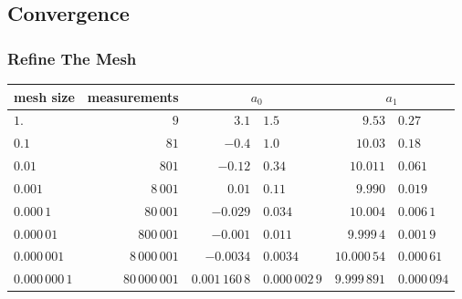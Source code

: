 \subsection{Convergence}
%
%
\begin{frame}\frametitle{Refine The Mesh}
\footnotesize{
\begin{table}[htp]
	\begin{center}
		\begin{tabular}{lr r@{\,$\pm$\,}l r@{\,$\pm$\,}l}
			\multicolumn{1}{c}{mesh size}    & \multicolumn{1}{c}{measurements} & 
			\multicolumn{2}{c}{$a_{0}$} & \multicolumn{2}{c}{$a_{1}$}\\\hline
$1.$ & $9$ & $3.1$ & $1.5$ & $9.53$ & $0.27$ \\
$0.1$ & $81$ & $-0.4$ & $1.0$ & $10.03$ & $0.18$ \\
$0.01$ & $801$ & $-0.12$ & $0.34$ & $10.011$ & $0.061$ \\
$0.001$ & $8\,001$ & $0.01$ & $0.11$ & $9.990$ & $0.019$ \\
$0.000\,1$ & $80\,001$ & $-0.029$ & $0.034$ & $10.004$ & $0.006\,1$ \\
$0.000\,01$ & $800\,001$ & $-0.001$ & $0.011$ & $9.999\,4$ & $0.001\,9$ \\
$0.000\,001$ & $8\,000\,001$ & $-0.0034$ & $0.0034$ & $10.000\,54$ & $0.000\,61$ \\
$0.000\,000\,1$ & $80\,000\,001$ & $0.001\,160\,8$ & $0.000\,002\,9$ & $9.999\,891$ & $0.000\,094$ \\			%
		\end{tabular}
	\end{center}
\label{tab:bevington more convergence numbers}
\end{table}
	}
\end{frame}
%
\newcommand{\xplacem}[0]			{\put(11,54)}
\newcommand{\xplacet}[0]			{\put(5,35)}
\newcommand{\xplacex}[0]			{\put(50,0)}
%
